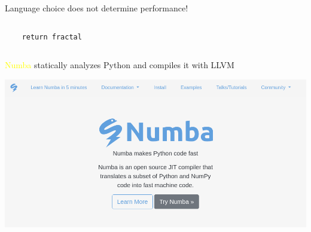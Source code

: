 \documentclass[aspectratio=169]{beamer}
\begin{document}
\begin{frame}[fragile]{Language choice does not determine performance!}
\begin{columns}
\begin{onlyenv}
\begin{verbatim}
    return fractal
\end{verbatim}
\end{onlyenv}
\end{columns}

\large
\vspace{0.25 cm}
\begin{center}
\end{center}
\end{frame}

\begin{frame}{\textcolor{yellow}{Numba} statically analyzes Python and compiles it with LLVM}
\vspace{0.35 cm}

\begin{center}
\includegraphics[width=\linewidth]{img/numba-website.png}
\end{center}
\end{frame}
\end{document}
